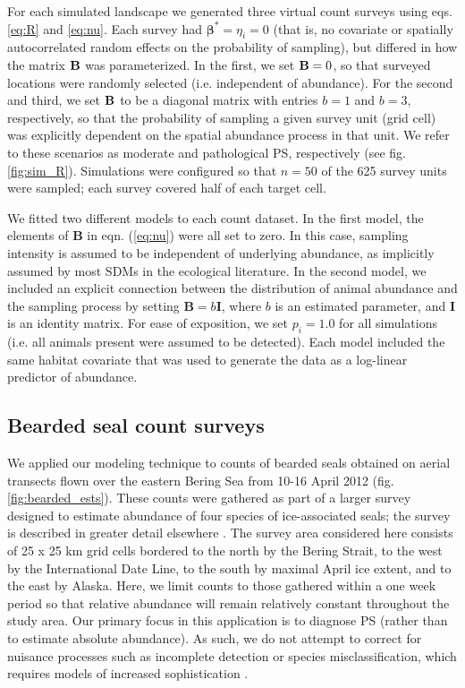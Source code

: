 \documentclass[times,mee,doublespace,]{besauth2}
\begin{document}
For each simulated landscape we generated three virtual count surveys using eqs. \ref{eq:R} and \ref{eq:nu}.  Each survey had $\boldsymbol{\beta}^*=\eta_i=0$ (that is, no covariate or spatially autocorrelated random effects on the probability of sampling), but differed in how the matrix ${\bf B}$ was parameterized.  In the first, we set ${\bf B}=0$, so that surveyed locations were randomly selected (i.e. independent of abundance).  For the second and third, we set ${\bf B}$ to be a diagonal matrix with entries $b=1$ and $b=3$, respectively, so that the probability of sampling a given survey unit (grid cell) was explicitly dependent on the spatial abundance process in that unit.  We refer to these scenarios as moderate and pathological PS, respectively (see fig. \ref{fig:sim_R}).  Simulations were configured so that $n=50$ of the 625 survey units were sampled; each survey covered half of each target cell.

We fitted two different models to each count dataset. In the first model, the elements of \textbf{B} in eqn. (\ref{eq:nu}) were all set to zero.  In this case, sampling intensity is assumed to be independent of underlying abundance, as implicitly assumed by most SDMs in the ecological literature.  In the second model, we included an explicit connection between the distribution of animal abundance and the sampling process by setting $\textbf{B}=b\textbf{I}$, where $b$ is an estimated parameter, and \textbf{I} is an identity matrix. For ease of exposition, we set $p_i = 1.0$ for all simulations (i.e. all animals present were assumed to be detected).  Each model included the same habitat covariate that was used to generate the data as a log-linear predictor of abundance.


\subsection{Bearded seal count surveys}

We applied our modeling technique to counts of bearded seals obtained on aerial transects flown over the eastern Bering Sea from 10-16 April 2012 (fig. \ref{fig:bearded_ests}). These counts were gathered as part of a larger survey designed to estimate abundance of four species of ice-associated seals; the survey is described in greater detail elsewhere \citep{ConnEtAl2014,ConnEtAl2015}. The survey area considered here consists of 25 x 25 km grid cells bordered to the north by the Bering Strait, to the west by the International Date Line, to the south by maximal April ice extent, and to the east by Alaska. Here, we limit counts to those gathered within a one week period so that relative abundance will remain relatively constant throughout the study area.  Our primary focus in this application is to diagnose PS (rather than to estimate absolute abundance).  As such, we do not attempt to correct for nuisance processes such as incomplete detection or species misclassification, which requires models of increased sophistication \citep{ConnEtAl2014}.
\end{document}
